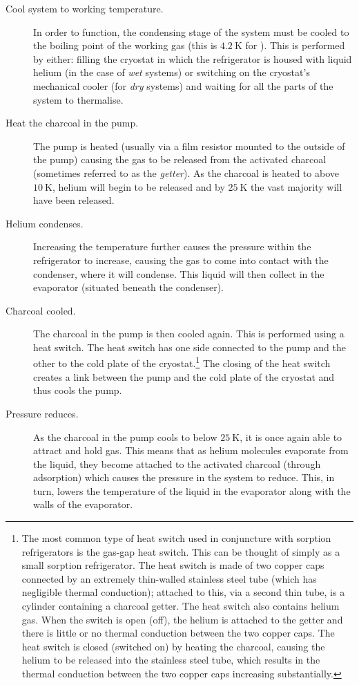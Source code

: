 \begin{description}
\item[Cool system to working temperature.] In order to function, the condensing stage of the system must be cooled to the boiling point of the working gas (this is $4.2~\mathrm{K}$ for ). This is performed by either: filling the cryostat in which the refrigerator is housed with liquid helium (in the case of \textit{wet} systems) or switching on the cryostat's mechanical cooler (for \textit{dry} systems) and waiting for all the parts of the system to thermalise.
\item[Heat the charcoal in the pump.] The pump is heated (usually via a film resistor mounted to the outside of the pump) causing the gas to be released from the activated charcoal (sometimes referred to as the \textit{getter}). As the charcoal is heated to above $10~\mathrm{K}$, helium will begin to be released and by $25~\mathrm{K}$ the vast majority will have been released.
\item[Helium condenses.] Increasing the temperature further causes the pressure within the refrigerator to increase, causing the gas to come into contact with the condenser, where it will condense. This liquid will then collect in the evaporator (situated beneath the condenser).
\item[Charcoal cooled.] The charcoal in the pump is then cooled again. This is performed using a heat switch. The heat switch has one side connected to the pump and the other to the cold plate of the cryostat.\footnote{The most common type of heat switch used in conjuncture with sorption refrigerators is the gas-gap heat switch. This can be thought of simply as a small sorption refrigerator. The heat switch is made of two copper caps connected by an extremely thin-walled stainless steel tube (which has negligible thermal conduction); attached to this, via a second thin tube, is a cylinder containing a charcoal getter. The heat switch also contains helium gas. When the switch is open (off), the helium is attached to the getter and there is little or no thermal conduction between the two copper caps. The heat switch is closed (switched on) by heating the charcoal, causing the helium to be released into the stainless steel tube, which results in the thermal conduction between the two copper caps increasing substantially.} The closing of the heat switch creates a link between the pump and the cold plate of the cryostat and thus cools the pump.
\item[Pressure reduces.] As the charcoal in the pump cools to below $25~\mathrm{K}$, it is once again able to attract and hold gas. This means that as helium molecules evaporate from the liquid, they become attached to the activated charcoal (through adsorption) which causes the pressure in the system to reduce. This, in turn, lowers the temperature of the liquid in the evaporator along with the walls of the evaporator.

\end{description}

